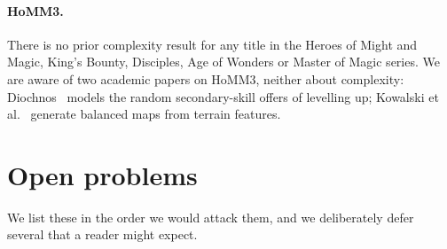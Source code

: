 \documentclass[11pt,a4paper]{article}
\theoremstyle{plain}
\theoremstyle{definition}
\theoremstyle{plain}
\theoremstyle{definition}
\theoremstyle{remark}
\begin{document}
\paragraph{HoMM3.} There is no prior complexity result for any title in the Heroes of Might and
Magic, King's Bounty, Disciples, Age of Wonders or Master of Magic series. We are aware of two
academic papers on HoMM3, neither about complexity: Diochnos~\cite{Dio10} models
the random secondary-skill offers of levelling up; Kowalski et al.~\cite{KMPPPS18} generate
balanced maps from terrain features.

\section{Open problems}\label{sec:open}

We list these in the order we would attack them, and we deliberately defer several that a reader
might expect.
\end{document}
